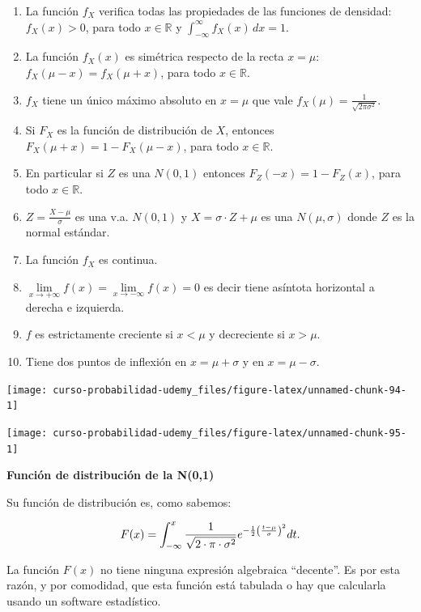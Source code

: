 \documentclass[]{book}
\providecommand{\tightlist}{%
  \setlength{\itemsep}{0pt}\setlength{\parskip}{0pt}}
\begin{document}
\begin{enumerate}
\def\labelenumi{\arabic{enumi}.}
\tightlist
\item
  La función \(f_{X}\) verifica todas las propiedades de las funciones de densidad: \(f_X(x)>0\), para todo \(x\in\mathbb{R}\) y \(\displaystyle\int_{-\infty}^\infty f_X(x)\,dx=1\).
\item
  La función \(f_X(x)\) es simétrica respecto de la recta \(x=\mu\): \(f_{X}(\mu-x)=f_{X}(\mu+x)\), para todo \(x\in\mathbb{R}\).
\item
  \(f_{X}\) tiene un único máximo absoluto en \(x=\mu\) que vale \(f_X(\mu)=\frac1{\sqrt{2\pi\sigma^2}}\).
\item
  Si \(F_{X}\) es la función de distribución de \(X\), entonces \(F_{X}(\mu+x)=1-F_{X}(\mu-x)\), para todo \(x\in\mathbb{R}\).
\item
  En particular si \(Z\) es una \(N(0,1)\) entonces \(F_{Z}(-x)=1-F_{Z}(x)\), para todo \(x\in\mathbb{R}\).
\item
  \(Z=\frac{X-\mu}{\sigma}\) es una v.a. \(N(0,1)\) y \(X=\sigma\cdot Z+\mu\) es una \(N(\mu,\sigma)\) donde \(Z\) es la normal estándar.
\item
  La función \(f_X\) es continua.
\item
  \(\lim\limits_{x\to+\infty}f(x)=\lim\limits_{x\to-\infty}f(x)=0\) es decir tiene asíntota horizontal a derecha e izquierda.
\item
  \(f\) es estrictamente creciente si \(x<\mu\) y decreciente si \(x>\mu\).
\item
  Tiene dos puntos de inflexión en \(x=\mu+\sigma\) y en \(x=\mu-\sigma\).
\end{enumerate}

\begin{center}\texttt{[image: curso-probabilidad-udemy\_files/figure-latex/unnamed-chunk-94-1]} \end{center}

\begin{center}\texttt{[image: curso-probabilidad-udemy\_files/figure-latex/unnamed-chunk-95-1]} \end{center}

\textbf{Función de distribución de la N(0,1)}

Su función de distribución es, como sabemos:

\[
F(x)=\displaystyle\int_{-\infty}^{x} {1\over{\sqrt{2\cdot \pi\cdot\sigma^2}}}
e^{-{1\over 2}{\left({t-\mu}\over{\sigma}\right)}^2} dt.
\]

La función \(F(x)\) no tiene ninguna expresión algebraica ``decente''. Es por esta razón, y por comodidad, que esta función está tabulada o hay que calcularla usando un software estadístico.
\end{document}

